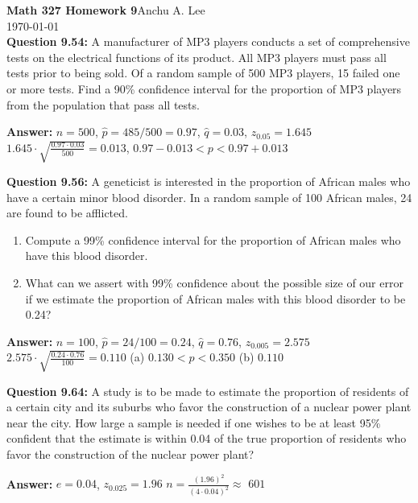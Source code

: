 \documentclass{article}
\begin{document}
\noindent\textbf{Math 327 Homework 9}\hfill Anchu A. Lee\\
\noindent\today\\\newline
\textbf{Question 9.54:}
A manufacturer of MP3 players conducts a set
of comprehensive tests on the electrical functions of its
product. All MP3 players must pass all tests prior to
being sold. Of a random sample of 500 MP3 players, 15
failed one or more tests. Find a 90\% confidence interval
for the proportion of MP3 players from the population
that pass all tests.
\begin{description}
    \item \textbf{Answer:} $n=500$, $\hat{p}=485 / 500 = 0.97$, $\hat{q}=0.03$, $z_{0.05}=1.645$\newline
    $1.645\cdot \sqrt{\frac{0.97\cdot 0.03}{500}} = 0.013$, $0.97 - 0.013 < p < 0.97 + 0.013$\newline
\end{description}

\textbf{Question 9.56:}
A geneticist is interested in the proportion of
African males who have a certain minor blood disorder. 
In a random sample of 100 African males, 24 are
found to be afflicted.
\begin{enumerate}[label = (\alph*) ]
    \item Compute a 99\% confidence interval for the 
    proportion of African males who have this blood disorder.
    \item What can we assert with 99\% confidence about the
    possible size of our error if we estimate the 
    proportion of African males with this blood disorder to be
    0.24?
\end{enumerate}
\begin{description}
    \item \textbf{Answer:} $n=100$, $\hat{p}=24/100 = 0.24$, $\hat{q}=0.76$, $z_0.005=2.575$\newline
    $2.575\cdot \sqrt{\frac{0.24\cdot 0.76}{100}}=0.110$ \newline
    (a) \boldmath$0.130 < p < 0.350$\newline
    (b) \boldmath$0.110$
\end{description}

\textbf{Question 9.64:}
A study is to be made to estimate the proportion of 
residents of a certain city and its suburbs who
favor the construction of a nuclear power plant near
the city. How large a sample is needed if one wishes to
be at least 95\% confident that the estimate is within
0.04 of the true proportion of residents who favor the
construction of the nuclear power plant?
\begin{description}
    \item \textbf{Answer:} $e=0.04$, $z_{0.025}=1.96$\newline
    $n=\frac{(1.96)^2}{(4\cdot 0.04)^2} \approx $ \boldmath$601$
\end{description}
\end{document}
